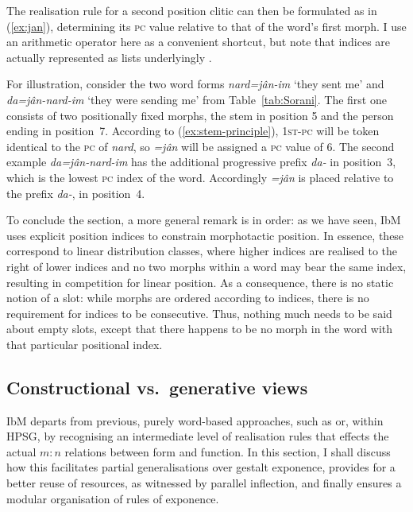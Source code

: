 \documentclass[output=paper,biblatex,babelshorthands,newtxmath,draftmode,colorlinks,citecolor=brown]{langscibook}
\begin{document}
\begin{exe}
\begin{xlist}
\begin{exe}
\begin{xlist}
The realisation rule for a second position clitic can then be
formulated  as
in (\ref{ex:jan}), determining its \textsc{pc} value relative to that of the
word's first morph. I use an arithmetic operator here as a convenient
shortcut, but note that indices are actually represented as lists 
underlyingly \citep{bonami-crysmann:2013}. 

\begin{exe}
  \ex \label{ex:jan}
\end{exe}

For illustration, consider the two word forms \textit{nard=jân-im}
`they sent me' and \textit{da=jân-nard-im} `they were sending me' from
Table~\ref{tab:Sorani}. The first one consists of two positionally
fixed morphs, the stem in position 5 and the person ending in
position~7. According to (\ref{ex:stem-principle}), \textsc{1st-pc}
will be token identical to the \textsc{pc} of \textit{nard}, so
\textit{=jân} will be assigned a \textsc{pc} value of 6. The second
example \textit{da=jân-nard-im} has the additional progressive prefix
\textit{da-} in position~3, which is the lowest \textsc{pc} index of the word. Accordingly
\textit{=jân} is placed relative to the prefix \textit{da-}, in position~4.

To conclude the section, a more general remark is in order: as we have
seen, IbM uses explicit position indices to constrain morphotactic
position. In essence, these correspond to linear distribution classes,
where higher indices are realised to the right of lower indices
and no two morphs within a word may bear the same index, resulting in
competition for linear position. As a consequence, there is no static
notion of a slot: while morphs are ordered according to indices, there
is no requirement for indices to be consecutive. Thus, nothing much
needs to be said about empty slots, except that there happens to be no
morph in the word with that particular positional index. 


\subsection{Constructional vs.\ generative views}
\label{sec:ConstrGen}

IbM departs from previous, purely word-based approaches, such as
\citet{Blevins14} or, within HPSG, \citet[Section~5.2.2]{Koenig99} by recognising an
intermediate level of realisation rules that effects the actual $m:n$
relations between form and function. In this section, I shall discuss
how this facilitates partial generalisations over gestalt exponence,
provides for a better reuse of resources, as witnessed by parallel
inflection, and finally ensures a modular organisation of rules of
exponence.


\end{xlist}
\end{exe}
\end{xlist}
\end{exe}
\end{document}
